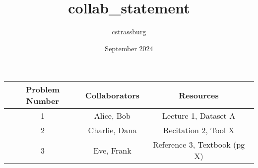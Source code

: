\documentclass{article}
\title{collab_statement}
\author{cstrassburg}
\date{September 2024}
\begin{document}
\begin{tabular}{|c|c|c|}
  \hline
  \textbf{Problem Number} & \textbf{Collaborators} & \textbf{Resources} \\
  \hline
  1 & Alice, Bob & Lecture 1, Dataset A \\
  \hline
  2 & Charlie, Dana & Recitation 2, Tool X \\
  \hline
  3 & Eve, Frank & Reference 3, Textbook (pg X) \\
  \hline
\end{tabular}
\end{document}
